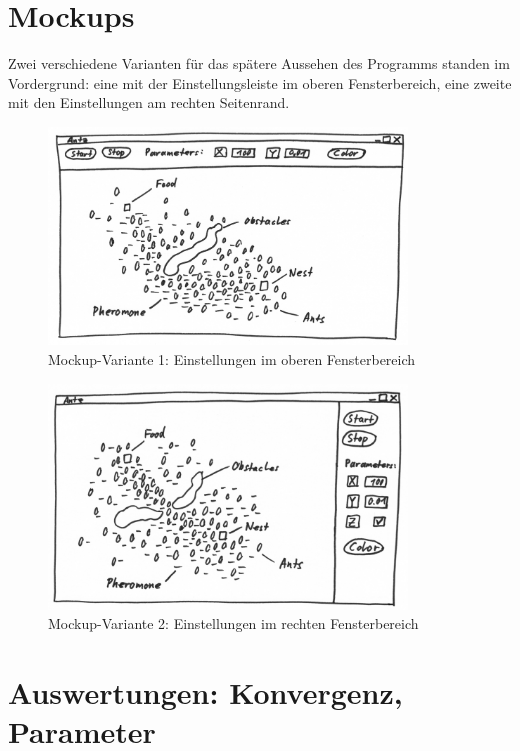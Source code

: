 \section{Mockups}

Zwei verschiedene Varianten für das spätere Aussehen des Programms standen im Vordergrund: eine mit der Einstellungsleiste im oberen Fensterbereich, eine zweite mit den Einstellungen am rechten Seitenrand.

\begin{figure}[h]
  \centering
	\includegraphics [width=0.85\textwidth]{images/Antz_Mockup_1_sw.png} 
	\caption{Mockup-Variante 1: Einstellungen im oberen Fensterbereich}
\end{figure}

\begin{figure}[h]
  \centering
	\includegraphics [width=0.85\textwidth]{images/Antz_Mockup_2_sw.png} 
	\caption{Mockup-Variante 2: Einstellungen im rechten Fensterbereich}
\end{figure}

\section{Auswertungen: Konvergenz, Parameter}

